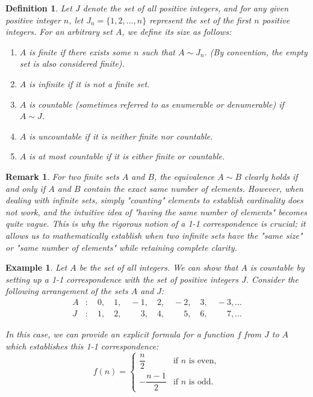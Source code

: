 \documentclass{article}
\theoremstyle{mythm}
\newtheorem{definition}[theorem]{Definition}
\newtheorem{remark}[theorem]{Remark}
\newtheorem{example}[theorem]{Example}
\begin{document}
\begin{definition}
Let $J$ denote the set of all positive integers, and for any given positive integer $n$, let $J_n = \{1, 2, \dots, n\}$ represent the set of the first $n$ positive integers. For an arbitrary set $A$, we define its size as follows:
\begin{enumerate}[label=(\alph*)]
    \item $A$ is \textit{finite} if there exists some $n$ such that $A \sim J_n$. (By convention, the empty set is also considered finite).
    \item $A$ is \textit{infinite} if it is not a finite set.
    \item $A$ is \textit{countable} (sometimes referred to as \textit{enumerable} or \textit{denumerable}) if $A \sim J$.
    \item $A$ is \textit{uncountable} if it is neither finite nor countable.
    \item $A$ is \textit{at most countable} if it is either finite or countable.
\end{enumerate}
\end{definition}
\begin{remark}
For two finite sets $A$ and $B$, the equivalence $A \sim B$ clearly holds if and only if $A$ and $B$ contain the exact same number of elements. However, when dealing with infinite sets, simply "counting" elements to establish cardinality does not work, and the intuitive idea of "having the same number of elements" becomes quite vague. This is why the rigorous notion of a 1-1 correspondence is crucial; it allows us to mathematically establish when two infinite sets have the "same size" or "same number of elements" while retaining complete clarity.
\end{remark}
\begin{example}
Let $A$ be the set of all integers. We can show that $A$ is countable by setting up a 1-1 correspondence with the set of positive integers $J$. Consider the following arrangement of the sets $A$ and $J$:
\begin{align*}
    A &: \quad 0, \quad 1, \quad -1, \quad 2, \quad -2, \quad 3, \quad -3, \dots \\
    J &: \quad 1, \quad 2, \quad \phantom{-}3, \quad 4, \quad \phantom{-}5, \quad 6, \quad \phantom{-}7, \dots
\end{align*}

In this case, we can provide an explicit formula for a function $f$ from $J$ to $A$ which establishes this 1-1 correspondence:
\[
f(n) = \begin{cases} 
      \dfrac{n}{2} & \text{if } n \text{ is even}, \\[1em]
      -\dfrac{n-1}{2} & \text{if } n \text{ is odd}.
   \end{cases}
\]
\end{example}
\end{document}
